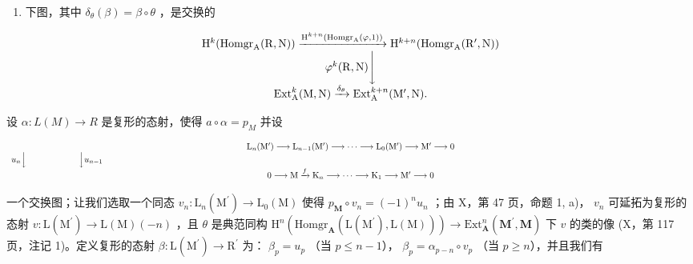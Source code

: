 \begin{enumerate}
\def\labelenumi{\alph{enumi})}
\setcounter{enumi}{1}
\tightlist
\item
  下图，其中 \(\delta_{\theta}(\beta) = \beta \circ \theta\) ，是交换的
\end{enumerate}

\[
\begin{array}{c} \mathrm{H} ^ {k} (\text {Homgr} _ {\mathrm{A}} (\mathrm{R}, \mathrm{N})) \xrightarrow {\mathrm{H} ^ {k + n} (\text {Homgr} _ {\mathrm{A}} (\varphi , 1))} \mathrm{H} ^ {k + n} (\text {Homgr} _ {\mathrm{A}} (\mathrm{R} ^ {\prime}, \mathrm{N})) \\ \varphi^ {k} (\mathrm{R}, \mathrm{N}) \Biggl \downarrow \\ \operatorname{Ext} _ {\mathrm{A}} ^ {k} (\mathrm{M}, \mathrm{N}) \xrightarrow {\delta_ {\theta}} \operatorname{Ext} _ {\mathrm{A}} ^ {k + n} (\mathrm{M} ^ {\prime}, \mathrm{N}). \end{array}
\]

设 \(\alpha : L(M) \to R\) 是复形的态射，使得 \(a \circ \alpha = p_{M}\) 并设

\[
\begin{array}{c} \mathrm{L} _ {n} (\mathrm{M} ^ {\prime}) \longrightarrow \mathrm{L} _ {n - 1} (\mathrm{M} ^ {\prime}) \longrightarrow \dots \longrightarrow \mathrm{L} _ {0} (\mathrm{M} ^ {\prime}) \longrightarrow \mathrm{M} ^ {\prime} \longrightarrow 0 \\ u _ {n} \Big \downarrow \qquad \qquad \qquad \Big \downarrow u _ {n - 1} \qquad \qquad \qquad \qquad \qquad \qquad \qquad \qquad \qquad \qquad \qquad \qquad \qquad \qquad \qquad \qquad \qquad \qquad \qquad \qquad \qquad \qquad \qquad \qquad \qquad \qquad \qquad \qquad \qquad \qquad \qquad \qquad \qquad \qquad \\ 0 \longrightarrow \mathrm{M} \xrightarrow {f} \mathrm{K} _ {n} \longrightarrow \dots \longrightarrow \mathrm{K} _ {1} \longrightarrow \mathrm{M} ^ {\prime} \longrightarrow 0 \end{array}
\]

一个交换图；让我们选取一个同态 \(v_{n}: \mathrm{L}_{n}(\mathrm{M}^{\prime}) \to \mathrm{L}_{0}(\mathrm{M})\) 使得 \(p_{\mathbf{M}} \circ v_{n} = (-1)^{n} u_{n}\) ；由 X，第 47 页，命题 1, a)， \(v_{n}\) 可延拓为复形的态射 \(v: \mathrm{L}(\mathrm{M}^{\prime}) \to \mathrm{L}(\mathrm{M})(-n)\) ，且 \(\theta\) 是典范同构 \(\mathrm{H}^{n}(\mathrm{Homgr}_{\mathbf{A}}(\mathrm{L}(\mathrm{M}^{\prime}), \mathrm{L}(\mathrm{M}))) \to \mathrm{Ext}_{\mathbf{A}}^{n}(\mathbf{M}^{\prime}, \mathbf{M})\) 下 \(v\) 的类的像 (X，第 117 页，注记 1)。定义复形的态射 \(\beta: \mathrm{L}(\mathrm{M}^{\prime}) \to \mathrm{R}^{\prime}\) 为： \(\beta_{p} = u_{p}\) （当 \(p \leqslant n - 1\)）， \(\beta_{p} = \alpha_{p-n} \circ v_{p}\) （当 \(p \geqslant n\)），并且我们有

